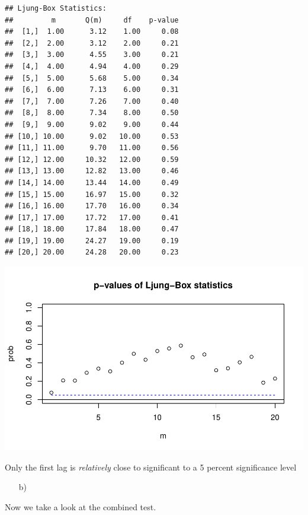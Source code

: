 \documentclass[12pt,a4paper]{article}
\newenvironment{Shaded}{\begin{snugshade}}{\end{snugshade}}
\newcommand{\DataTypeTok}[1]{\textcolor[rgb]{0.13,0.29,0.53}{#1}}
\newcommand{\DecValTok}[1]{\textcolor[rgb]{0.00,0.00,0.81}{#1}}
\newcommand{\KeywordTok}[1]{\textcolor[rgb]{0.13,0.29,0.53}{\textbf{#1}}}
\newcommand{\NormalTok}[1]{#1}
\newcommand{\OperatorTok}[1]{\textcolor[rgb]{0.81,0.36,0.00}{\textbf{#1}}}
\begin{document}
\begin{verbatim}
## Ljung-Box Statistics:  
##         m       Q(m)     df    p-value
##  [1,]  1.00      3.12    1.00     0.08
##  [2,]  2.00      3.12    2.00     0.21
##  [3,]  3.00      4.55    3.00     0.21
##  [4,]  4.00      4.94    4.00     0.29
##  [5,]  5.00      5.68    5.00     0.34
##  [6,]  6.00      7.13    6.00     0.31
##  [7,]  7.00      7.26    7.00     0.40
##  [8,]  8.00      7.34    8.00     0.50
##  [9,]  9.00      9.02    9.00     0.44
## [10,] 10.00      9.02   10.00     0.53
## [11,] 11.00      9.70   11.00     0.56
## [12,] 12.00     10.32   12.00     0.59
## [13,] 13.00     12.82   13.00     0.46
## [14,] 14.00     13.44   14.00     0.49
## [15,] 15.00     16.97   15.00     0.32
## [16,] 16.00     17.70   16.00     0.34
## [17,] 17.00     17.72   17.00     0.41
## [18,] 18.00     17.84   18.00     0.47
## [19,] 19.00     24.27   19.00     0.19
## [20,] 20.00     24.28   20.00     0.23
\end{verbatim}

\includegraphics{exercise_1_files/figure-latex/unnamed-chunk-5-1.pdf}

Only the first lag is \emph{relatively} close to significant to a 5
percent significance level

\begin{itemize}
  \item[b)] $\quad$
\end {itemize}

Now we take a look at the combined test.

\begin{Shaded}
\end{Shaded}
\end{document}
